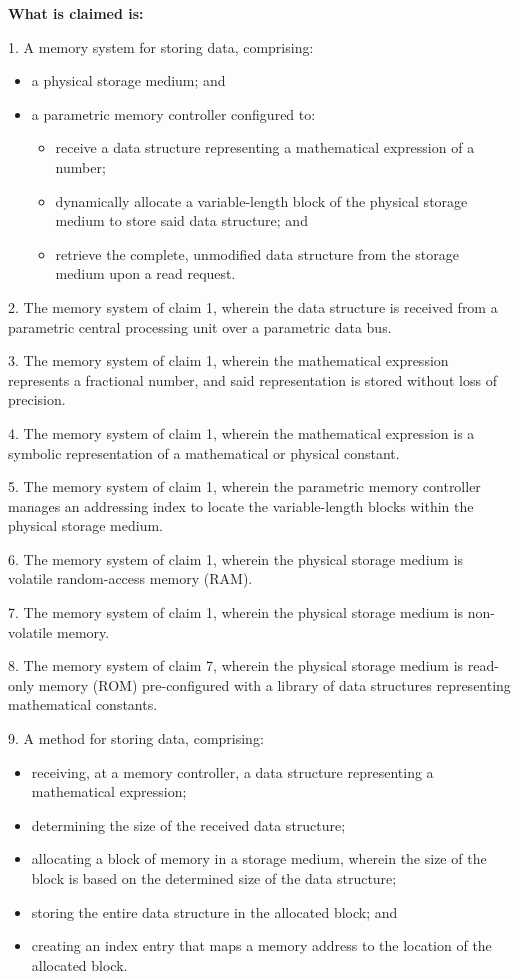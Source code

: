 \documentclass[11pt,letterpaper]{article}
\begin{document}
\vspace{0.8cm}

\textbf{What is claimed is:}

1. A memory system for storing data, comprising:
\begin{itemize}[leftmargin=2.5em]
    \item[] a physical storage medium; and
    \item[] a parametric memory controller configured to:
    \begin{itemize}[leftmargin=2.5em]
        \item[--] receive a data structure representing a mathematical expression of a number;
        \item[--] dynamically allocate a variable-length block of the physical storage medium to store said data structure; and
        \item[--] retrieve the complete, unmodified data structure from the storage medium upon a read request.
    \end{itemize}
\end{itemize}

2. The memory system of claim 1, wherein the data structure is received from a parametric central processing unit over a parametric data bus.

3. The memory system of claim 1, wherein the mathematical expression represents a fractional number, and said representation is stored without loss of precision.

4. The memory system of claim 1, wherein the mathematical expression is a symbolic representation of a mathematical or physical constant.

5. The memory system of claim 1, wherein the parametric memory controller manages an addressing index to locate the variable-length blocks within the physical storage medium.

6. The memory system of claim 1, wherein the physical storage medium is volatile random-access memory (RAM).

7. The memory system of claim 1, wherein the physical storage medium is non-volatile memory.

8. The memory system of claim 7, wherein the physical storage medium is read-only memory (ROM) pre-configured with a library of data structures representing mathematical constants.

9. A method for storing data, comprising:
\begin{itemize}[leftmargin=2.5em]
    \item[] receiving, at a memory controller, a data structure representing a mathematical expression;
    \item[] determining the size of the received data structure;
    \item[] allocating a block of memory in a storage medium, wherein the size of the block is based on the determined size of the data structure;
    \item[] storing the entire data structure in the allocated block; and
    \item[] creating an index entry that maps a memory address to the location of the allocated block.
\end{itemize}
\end{document}
